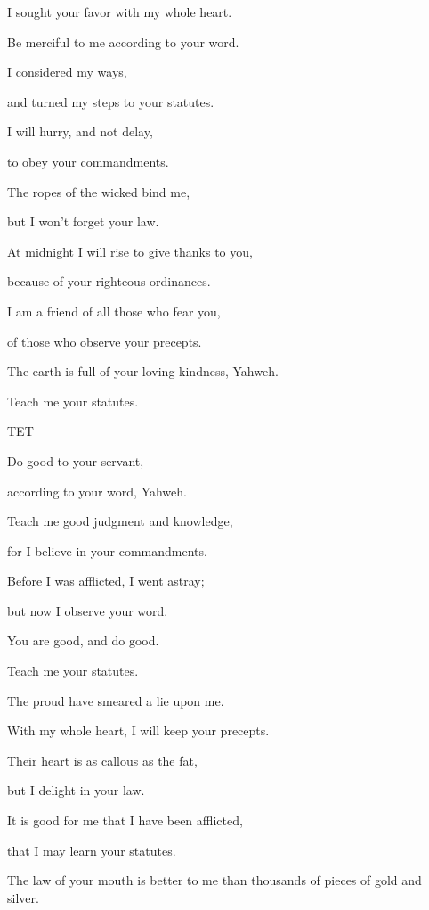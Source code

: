 {\par }{\Q {}I sought your favor with my whole heart.
\par }{\QB Be merciful to me according to your word.
\par }{\Q {}I considered my ways,
\par }{\QB and turned my steps to your statutes.
\par }{\Q {}I will hurry, and not delay,
\par }{\QB to obey your commandments.
\par }{\Q {}The ropes of the wicked bind me,
\par }{\QB but I won’t forget your law.
\par }{\Q {}At midnight I will rise to give thanks to you,
\par }{\QB because of your righteous ordinances.
\par }{\Q {}I am a friend of all those who fear you,
\par }{\QB of those who observe your precepts.
\par }{\Q {}The earth is full of your loving kindness, Yahweh.
\par }{\QB Teach me your statutes.
\par }{\D TET
\par }{\Q {}Do good to your servant,
\par }{\QB according to your word, Yahweh.
\par }{\Q {}Teach me good judgment and knowledge,
\par }{\QB for I believe in your commandments.
\par }{\Q {}Before I was afflicted, I went astray;
\par }{\QB but now I observe your word.
\par }{\Q {}You are good, and do good.
\par }{\QB Teach me your statutes.
\par }{\Q {}The proud have smeared a lie upon me.
\par }{\QB With my whole heart, I will keep your precepts.
\par }{\Q {}Their heart is as callous as the fat,
\par }{\QB but I delight in your law.
\par }{\Q {}It is good for me that I have been afflicted,
\par }{\QB that I may learn your statutes.
\par }{\Q {}The law of your mouth is better to me than thousands of pieces of gold and silver.
}
